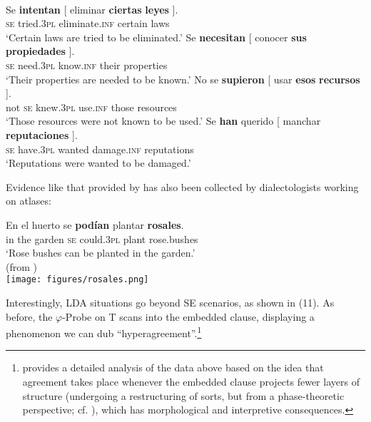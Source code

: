 \documentclass[output=paper]{langsci/langscibook}
\begin{document}
\ea%
    \label{ex:gallego:9}\\
    \ea
    \gll Se  \textbf{intentan}  [ eliminar        \textbf{ciertas}  \textbf{leyes} ].        \\
         \textsc{se} tried\textsc{{}.3pl} {}  eliminate.\textsc{inf}  certain   laws\\
    \glt ‘Certain laws are tried to be eliminated.’  
    \ex
    \gll Se  \textbf{necesitan}  [ conocer     \textbf{sus}    \textbf{propiedades} ].         \\
            \textsc{se}  need\textsc{{}.3pl} {}  know.\textsc{inf}   their  properties\\
    \glt    ‘Their properties are needed to be known.’
    \ex
    \gll No se   \textbf{supieron}  [ usar        \textbf{esos}    \textbf{recursos} ].        \\
            not \textsc{se} knew\textsc{{}.3pl} {}   use.\textsc{inf}   those   resources\\
    \glt    ‘Those resources were not known to be used.’
    \ex
    \gll  Se   \textbf{han}           querido [ manchar        \textbf{reputaciones} ].     \\
            \textsc{se} have\textsc{{}.3pl} wanted {}   damage.\textsc{inf}   reputations\\
    \glt     ‘Reputations were wanted to be damaged.’
    \z
\z

Evidence like that provided by \citet{RAE-ASALE2009} has also been collected by dialectologists working on atlases:

\ea%
\gll En el huerto se \textbf{podían} plantar \textbf{rosales}.\\
in the garden \textsc{se} could.\textsc{3pl} plant rose.bushes\\
\glt ‘Rose bushes can be planted in the garden.’\\
(from \citealt[13]{Benito2010}) \\
     \texttt{[image: figures/rosales.png]}
\z

Interestingly, LDA situations go beyond SE scenarios, as shown in (11). As before, the $\varphi $-Probe on T scans into the embedded clause, displaying a phenomenon we can dub “hyperagreement”.\footnote{\citet{Fernández-Serrano2016} provides a detailed analysis of the data above based on the idea that agreement takes place whenever the embedded clause projects fewer layers of structure (undergoing a restructuring of sorts, but from a phase-theoretic perspective; cf. \citealt{Gallego2009}), which has morphological and interpretive consequences.}\largerpage[-3]
\end{document}
